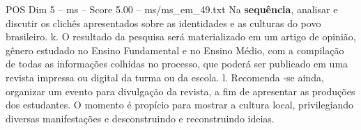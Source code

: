 \begin{textsample}{POS Dim 5 – ms – Score 5.00 – ms/ms\_em\_49.txt}
Na \textbf{sequência}, analisar e discutir os clichês apresentados sobre as identidades e as culturas do povo brasileiro. k.
O resultado da pesquisa será materializado em um artigo de opinião, gênero estudado no Ensino Fundamental e no Ensino Médio, com a compilação de todas as informações colhidas no processo, que poderá ser publicado em uma revista impressa ou digital da turma ou da escola. l.
Recomenda -se ainda, organizar um evento para divulgação da revista, a fim de apresentar as produções dos estudantes.
O momento é propício para mostrar a cultura local, privilegiando diversas manifestações e desconstruindo e reconstruindo ideias.

\end{textsample}
